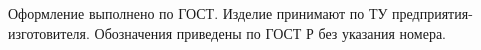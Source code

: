 Оформление выполнено по ГОСТ. %
Изделие принимают по ТУ предприятия-изготовителя. %
Обозначения приведены по ГОСТ Р без указания номера. %
